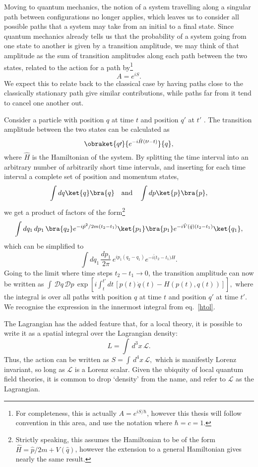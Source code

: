 Moving to quantum mechanics, the notion of a system travelling along a singular path between configurations no longer applies, which leaves us to consider all possible paths that a system may take from an initial to a final state. Since quantum mechanics already tells us that the probability of a system going from one state to another is given by a transition amplitude, we may think of that amplitude as the sum of transition amplitudes along each path between the two states, related to the action for a path by\footnote{For completeness, this is actually $A=e^{iS/\hbar}$, however this thesis will follow convention in this area, and use the notation where $\hbar = c = 1$.}
\[A=e^{iS}.\label{e.A}\]
We expect this to relate back to the classical case by having paths close to the classically stationary path give similar contributions, while paths far from it tend to cancel one another out.

Consider a particle with position $q$ at time $t$ and position $q\prime$ at $t\prime$ \cite{sred:tramp}. The transition amplitude between the two states can be calculated as
\[\obraket{q\prime}{e^{-i\hat H(t\prime-t)}}{q},\]
where $\hat H$ is the Hamiltonian of the system. By splitting the time interval into an arbitrary number of arbitrarily short time intervals, and inserting for each time interval a complete set of position and momentum states,
\[\int dq \ket{q}\bra{q}\quad\textrm{and}\quad\int dp \ket{p}\bra{p},\]
we get a product of factors of the form\footnote{Strictly speaking, this assumes the Hamiltonian to be of the form $\hat H=\hat p/2m+V(\hat q)$, however the extension to a general Hamiltonian gives nearly the same result.}
\[\int dq_1\,dp_1\,\bra{q_2}e^{-i\hat p^2/2m(t_2-t_1)}\ket{p_1}\bra{p_1}e^{-i\hat V(\hat q)(t_2-t_1)}\ket{q_1},\]
which can be simplified to
\[\int dq_1\,\frac{dp_1}{2\pi}\,e^{ip_1(q_2-q_1)}e^{-i\hat (t_2-t_1)H}.\]
Going to the limit where time steps $t_2-t_1\rightarrow0$, the transition amplitude can now be written as
\(\int\,\mathcal Dq\,\mathcal Dp\,\exp\left[i\int_t^{t\prime}dt\,[p(t)\dot q(t)-H(p(t),q(t))]\right],\label{e.Dq}\)
where the integral is over all paths with position $q$ at time $t$ and position $q\prime$ at time $t\prime$. We recognise the expression in the innermost integral from eq.~\eqref{htol}.

The Lagrangian has the added feature that, for a local theory, it is possible to write it as a spatial integral over the Lagrangian density:
\[L=\int \,d^3x\,\mathcal L.\]
Thus, the action can be written as
\(S=\int\,d^4x\,\mathcal L,\label{e.S}\)
which is manifestly Lorenz invariant, so long as $\mathcal L$ is a Lorenz scalar. Given the ubiquity of local quantum field theories, it is common to drop `density' from the name, and refer to $\mathcal L$ as the Lagrangian.